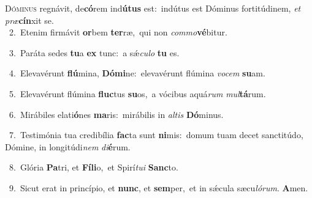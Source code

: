 \lettrine{\initial\textcolor{\initialcolor}{D}}{óminus} regnávit, de\-\textbf{có}\-rem ind\-\textbf{ú}\-\textbf{tus} est:~\star indútus est Dóminus fortitúdinem, \textit{et} \textit{præ}\-\textbf{cín}xit se.\\
{\numbfont\textcolor{\numbcolor}{~2.}}~Etenim firmávit \textbf{or}\-bem \textbf{ter}\-ræ,~\star qui non \textit{com}\-\textit{mo}\textbf{vé}bitur.\par
{\numbfont\textcolor{\numbcolor}{~3.}}~Paráta sedes \textbf{tu}\-a \textbf{ex} tunc:~\star a sǽ\-\textit{cu}\-\textit{lo} \textbf{tu} es.\par
{\numbfont\textcolor{\numbcolor}{~4.}}~Elevavérunt \textbf{flú}\-mina, \textbf{Dó}\-\textbf{mi}ne:~\star elevavérunt flúmina \textit{vo}\-\textit{cem} \textbf{su}\-am.\par
{\numbfont\textcolor{\numbcolor}{~5.}}~Elevavérunt flúmina \textbf{fluc}\-tus \textbf{su}\-os,~\star a vócibus aquá\textit{rum} \textit{mul}\-\textbf{tá}rum.\par
{\numbfont\textcolor{\numbcolor}{~6.}}~Mirábiles elati\-\textbf{ó}\-nes \textbf{ma}\-ris:~\star mirábilis in \textit{al}\-\textit{tis} \textbf{Dó}\-minus.\par
{\numbfont\textcolor{\numbcolor}{~7.}}~Testimónia tua credibília \textbf{fac}\-ta sunt \textbf{ni}\-mis:~\star domum tuam decet sanctitúdo, Dómine, in longitúdi\textit{nem} \textit{di}\-\textbf{é}rum.\par
{\numbfont\textcolor{\numbcolor}{~8.}}~Glória \textbf{Pa}\-tri, et \textbf{Fí}\-\textbf{li}o,~\star et Spirí\-\textit{tu}\-\textit{i} \textbf{Sanc}\-to.\par
{\numbfont\textcolor{\numbcolor}{~9.}}~Sicut erat in princípio, et \textbf{nunc}\-, et \textbf{sem}\-per,~\star et in sǽcula sæcu\-\textit{ló}\-\textit{rum}. \textbf{A}\-men.\par
